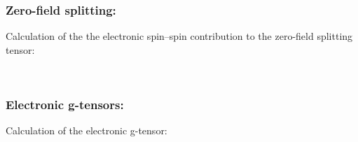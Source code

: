 \subsubsection{Zero-field splitting: }

Calculation of the the electronic spin--spin contribution to the zero-field splitting
tensor:

\begin{description}
  \item{} \\
\end{description}

\subsubsection{Electronic g-tensors:  }
\label{sec:g-tensor}
Calculation of the electronic g-tensor:

